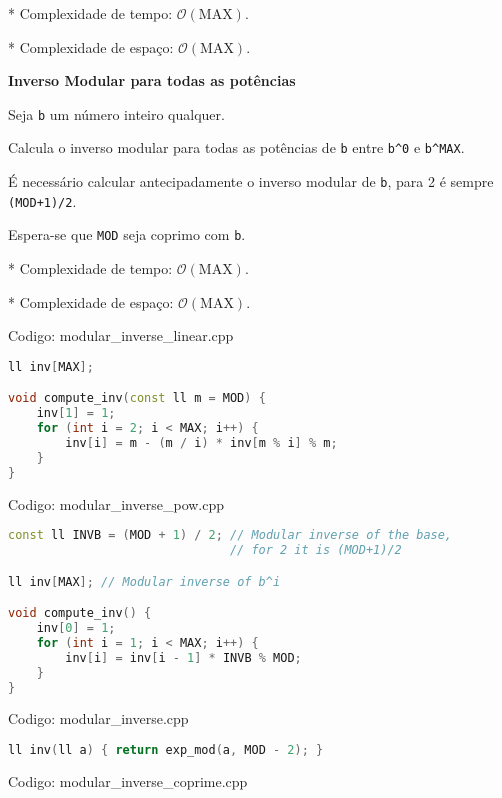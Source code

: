 \documentclass[10pt, a4paper, oneside]{book}
\begin{document}
* Complexidade de tempo: $\mathcal{O}(\text{MAX})$.

* Complexidade de espaço: $\mathcal{O}(\text{MAX})$.



\textbf{Inverso Modular para todas as potências} 



Seja \lstinline{b} um número inteiro qualquer.



Calcula o inverso modular para todas as potências de \lstinline{b} entre \lstinline{b^0} e \lstinline{b^MAX}.



É necessário calcular antecipadamente o inverso modular de \lstinline{b}, para 2 é sempre \lstinline{(MOD+1)/2}.



Espera-se que \lstinline{MOD} seja coprimo com \lstinline{b}.



* Complexidade de tempo: $\mathcal{O}(\text{MAX})$.

* Complexidade de espaço: $\mathcal{O}(\text{MAX})$.
\hfill

Codigo: modular\_inverse\_linear.cpp

\begin{lstlisting}[language=C++]
ll inv[MAX];

void compute_inv(const ll m = MOD) {
    inv[1] = 1;
    for (int i = 2; i < MAX; i++) {
        inv[i] = m - (m / i) * inv[m % i] % m;
    }
}
\end{lstlisting}
\hfill

Codigo: modular\_inverse\_pow.cpp

\begin{lstlisting}[language=C++]
const ll INVB = (MOD + 1) / 2; // Modular inverse of the base,
                               // for 2 it is (MOD+1)/2

ll inv[MAX]; // Modular inverse of b^i

void compute_inv() {
    inv[0] = 1;
    for (int i = 1; i < MAX; i++) {
        inv[i] = inv[i - 1] * INVB % MOD;
    }
}
\end{lstlisting}
\hfill

Codigo: modular\_inverse.cpp

\begin{lstlisting}[language=C++]
ll inv(ll a) { return exp_mod(a, MOD - 2); }
\end{lstlisting}
\hfill

Codigo: modular\_inverse\_coprime.cpp
\end{document}
